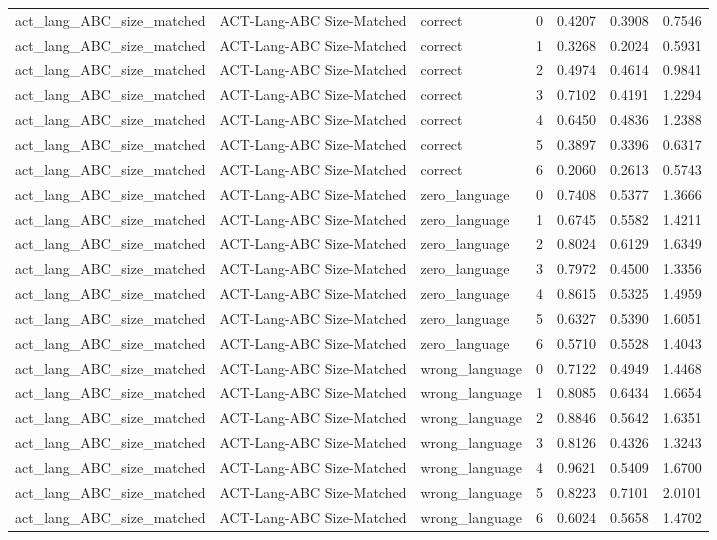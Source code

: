 \begin{tabular}{lllrrrr}
act\_lang\_ABC\_size\_matched & ACT-Lang-ABC Size-Matched & correct & 0 & 0.4207 & 0.3908 & 0.7546 \\
act\_lang\_ABC\_size\_matched & ACT-Lang-ABC Size-Matched & correct & 1 & 0.3268 & 0.2024 & 0.5931 \\
act\_lang\_ABC\_size\_matched & ACT-Lang-ABC Size-Matched & correct & 2 & 0.4974 & 0.4614 & 0.9841 \\
act\_lang\_ABC\_size\_matched & ACT-Lang-ABC Size-Matched & correct & 3 & 0.7102 & 0.4191 & 1.2294 \\
act\_lang\_ABC\_size\_matched & ACT-Lang-ABC Size-Matched & correct & 4 & 0.6450 & 0.4836 & 1.2388 \\
act\_lang\_ABC\_size\_matched & ACT-Lang-ABC Size-Matched & correct & 5 & 0.3897 & 0.3396 & 0.6317 \\
act\_lang\_ABC\_size\_matched & ACT-Lang-ABC Size-Matched & correct & 6 & 0.2060 & 0.2613 & 0.5743 \\
act\_lang\_ABC\_size\_matched & ACT-Lang-ABC Size-Matched & zero\_language & 0 & 0.7408 & 0.5377 & 1.3666 \\
act\_lang\_ABC\_size\_matched & ACT-Lang-ABC Size-Matched & zero\_language & 1 & 0.6745 & 0.5582 & 1.4211 \\
act\_lang\_ABC\_size\_matched & ACT-Lang-ABC Size-Matched & zero\_language & 2 & 0.8024 & 0.6129 & 1.6349 \\
act\_lang\_ABC\_size\_matched & ACT-Lang-ABC Size-Matched & zero\_language & 3 & 0.7972 & 0.4500 & 1.3356 \\
act\_lang\_ABC\_size\_matched & ACT-Lang-ABC Size-Matched & zero\_language & 4 & 0.8615 & 0.5325 & 1.4959 \\
act\_lang\_ABC\_size\_matched & ACT-Lang-ABC Size-Matched & zero\_language & 5 & 0.6327 & 0.5390 & 1.6051 \\
act\_lang\_ABC\_size\_matched & ACT-Lang-ABC Size-Matched & zero\_language & 6 & 0.5710 & 0.5528 & 1.4043 \\
act\_lang\_ABC\_size\_matched & ACT-Lang-ABC Size-Matched & wrong\_language & 0 & 0.7122 & 0.4949 & 1.4468 \\
act\_lang\_ABC\_size\_matched & ACT-Lang-ABC Size-Matched & wrong\_language & 1 & 0.8085 & 0.6434 & 1.6654 \\
act\_lang\_ABC\_size\_matched & ACT-Lang-ABC Size-Matched & wrong\_language & 2 & 0.8846 & 0.5642 & 1.6351 \\
act\_lang\_ABC\_size\_matched & ACT-Lang-ABC Size-Matched & wrong\_language & 3 & 0.8126 & 0.4326 & 1.3243 \\
act\_lang\_ABC\_size\_matched & ACT-Lang-ABC Size-Matched & wrong\_language & 4 & 0.9621 & 0.5409 & 1.6700 \\
act\_lang\_ABC\_size\_matched & ACT-Lang-ABC Size-Matched & wrong\_language & 5 & 0.8223 & 0.7101 & 2.0101 \\
act\_lang\_ABC\_size\_matched & ACT-Lang-ABC Size-Matched & wrong\_language & 6 & 0.6024 & 0.5658 & 1.4702 \\
\bottomrule
\end{tabular}
